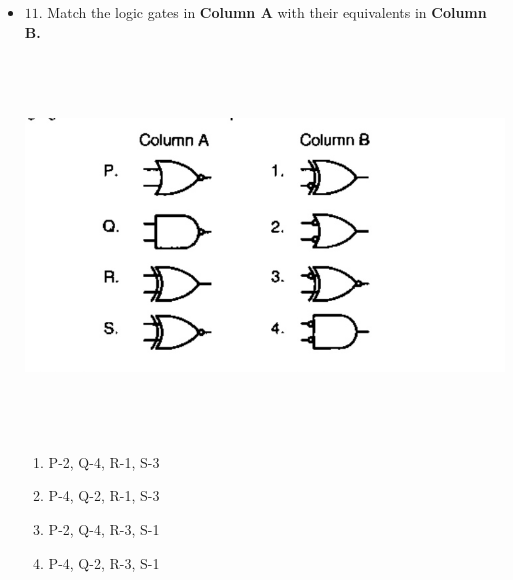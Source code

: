 \documentclass[a4paper,12pt]{article}
\begin{document}
\begin{itemize}[label={}, leftmargin=0pt]
	\item $11$. Match the logic gates in \textbf{Column A} with their equivalents in \textbf{Column B.}
\begin{center}
\includegraphics[width=15cm, height=10cm]{circuit.jpg}
\end{center}
	\begin{multicols}{2}
		\begin{enumerate}[label=\Alph*]
			\item P-2, Q-4, R-1, S-3
			\item P-4, Q-2, R-1, S-3 
			\item P-2, Q-4, R-3, S-1  
			\item P-4, Q-2, R-3, S-1
		\end{enumerate}
	\end{multicols}

\end{itemize}
\end{document}
